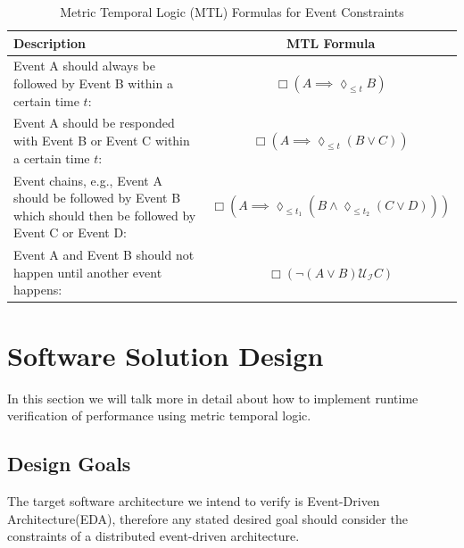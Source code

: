 \documentclass[twocolumn]{article}
\begin{document}
\begin{table}[t]
	\centering
	\renewcommand{\arraystretch}{1.5}
	\begin{tabular}{|p{10cm}|c|}
		\hline
		\textbf{Description}                                                                                           & \textbf{MTL Formula} \\
		\hline
		Event A should always be followed by Event B within a certain time \( t \):                                    &
		$\Box (A \implies \lozenge_{\leq t} B)$                                                                                               \\
		\hline
		Event A should be responded with Event B or Event C within a certain time \( t \):                             &
		$\Box (A \implies \lozenge_{\leq t} (B \lor C))$                                                                                      \\
		\hline
		Event chains, e.g., Event A should be followed by Event B which should then be followed by Event C or Event D: &
		$\Box (A \implies \lozenge_{\leq t_1} (B \land \lozenge_{\leq t_2} (C \lor D)))$                                                      \\
		\hline
		Event A and Event B should not happen until another event happens:                                             &
		$\Box (\neg (A \lor B) \mathcal{U_I} C)$                                                                                              \\
		\hline
	\end{tabular}
	\caption{Metric Temporal Logic (MTL) Formulas for Event Constraints}
	\label{table:mtl_formulas}
\end{table}


\section{Software Solution Design}
In this section we will talk more in detail about how to implement runtime verification of performance using metric temporal logic.

\subsection{Design Goals}
The target software architecture we intend to verify is Event-Driven Architecture(EDA), therefore any stated desired goal
should consider the constraints of a distributed event-driven architecture.
\end{document}
